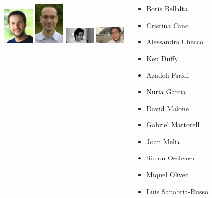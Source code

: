\documentclass{beamer}
\begin{document}
\begin{frame}
\begin{columns}[t]
\begin{center}
        \includegraphics[width=0.6in]{figures/joan}
        \includegraphics[width=0.6in]{figures/simon}
        \includegraphics[width=0.6in]{figures/miquel}
        \includegraphics[width=0.6in]{figures/luis}
      \end{center}
      \begin{block}{}
        \begin{itemize}
          \item Boris Bellalta
          \item Cristina Cano
          \item Alessandro Checco
          \item Ken Duffy
          \item Azadeh Faridi
          \item Nuria Garcia
          \item David Malone
          \item Gabriel Martorell
          \item Joan Melia
          \item Simon Oechsner
          \item Miquel Oliver
          \item Luis Sanabria-Russo
        \end{itemize}
      \end{block}
  \end{columns}
\end{frame}
\end{document}
